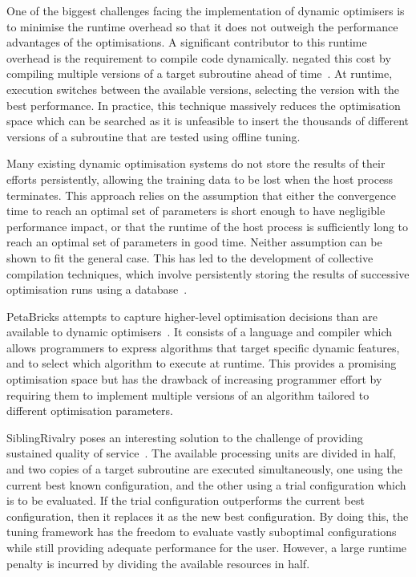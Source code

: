 One of the biggest challenges facing the implementation of dynamic
optimisers is to minimise the runtime overhead so that it does not
outweigh the performance advantages of the optimisations. A
significant contributor to this runtime overhead is the requirement to
compile code dynamically. \citeauthor{Fursin2005} negated this cost by
compiling multiple versions of a target subroutine ahead of
time~\cite{Fursin2005}. At runtime, execution switches between the
available versions, selecting the version with the best
performance. In practice, this technique massively reduces the
optimisation space which can be searched as it is unfeasible to insert
the thousands of different versions of a subroutine that are tested
using offline tuning.

Many existing dynamic optimisation systems do not store the results of
their efforts persistently, allowing the training data to be lost when
the host process terminates. This approach relies on the assumption
that either the convergence time to reach an optimal set of parameters
is short enough to have negligible performance impact, or that the
runtime of the host process is sufficiently long to reach an optimal
set of parameters in good time. Neither assumption can be shown to fit
the general case. This has led to the development of collective
compilation techniques, which involve persistently storing the results
of successive optimisation runs using a database~\cite{Fursin2010}.

PetaBricks attempts to capture higher-level optimisation decisions
than are available to dynamic optimisers~\cite{Ansel2009a}. It
consists of a language and compiler which allows programmers to
express algorithms that target specific dynamic features, and to
select which algorithm to execute at runtime. This provides a
promising optimisation space but has the drawback of increasing
programmer effort by requiring them to implement multiple versions of
an algorithm tailored to different optimisation parameters.

SiblingRivalry poses an interesting solution to the challenge of
providing sustained quality of service~\cite{Ansel2012}. The available
processing units are divided in half, and two copies of a target
subroutine are executed simultaneously, one using the current best
known configuration, and the other using a trial configuration which
is to be evaluated. If the trial configuration outperforms the current
best configuration, then it replaces it as the new best
configuration. By doing this, the tuning framework has the freedom to
evaluate vastly suboptimal configurations while still providing
adequate performance for the user. However, a large runtime penalty is
incurred by dividing the available resources in half.
